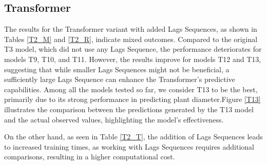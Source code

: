 \subsection{Transformer}
The results for the Transformer variant with added Lags Sequences, as shown in Tables \ref{T2_M} and \ref{T2_R}, indicate mixed outcomes. Compared to the original T3 model, which did not use any Lags Sequence, the performance deteriorates for models T9, T10, and T11. However, the results improve for models T12 and T13, suggesting that while smaller Lags Sequences might not be beneficial, a sufficiently large Lags Sequence can enhance the Transformer's predictive capabilities. Among all the models tested so far, we consider T13 to be the best, primarily due to its strong performance in predicting plant diameter.Figure \ref{T13} illustrates the comparison between the predictions generated by the T13 model and the actual observed values, highlighting the model's effectiveness.

On the other hand, as seen in Table \ref{T2_T}, the addition of Lags Sequences leads to increased training times, as working with Lags Sequences requires additional comparisons, resulting in a higher computational cost.



